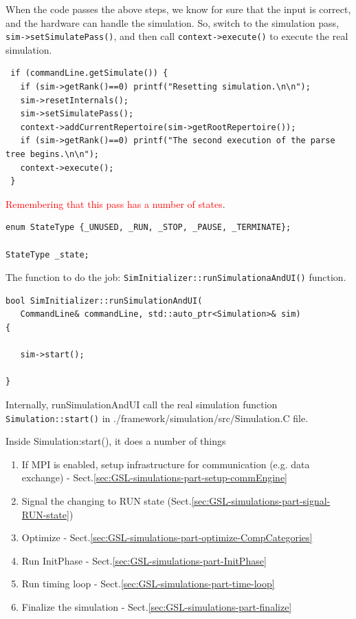 When the code passes the above steps, we know for sure that the
input is correct, and the hardware can handle the simulation. 
So, switch to the simulation pass, \verb!sim->setSimulatePass()!, and then
call \verb!context->execute()! to execute the real simulation.

\begin{lstlisting}
 if (commandLine.getSimulate()) {
   if (sim->getRank()==0) printf("Resetting simulation.\n\n");
   sim->resetInternals();  
   sim->setSimulatePass();
   context->addCurrentRepertoire(sim->getRootRepertoire());
   if (sim->getRank()==0) printf("The second execution of the parse tree begins.\n\n");
   context->execute();
 }
\end{lstlisting}

\textcolor{red}{Remembering that this pass has a number of states}.
\begin{verbatim}
enum StateType {_UNUSED, _RUN, _STOP, _PAUSE, _TERMINATE}; 

StateType _state;
\end{verbatim}

The function to do the job: \verb!SimInitializer::runSimulationaAndUI()!
function.
\begin{verbatim}
bool SimInitializer::runSimulationAndUI(                                                                      
   CommandLine& commandLine, std::auto_ptr<Simulation>& sim)                                                  
{         

   sim->start();

}
\end{verbatim}
Internally, runSimulationAndUI call the real simulation function
\verb!Simulation::start()! in ./framework/simulation/src/Simulation.C file.

Inside Simulation:start(), it does a number of things
\begin{enumerate}
  \item If MPI is enabled, setup infrastructure for communication (e.g. data
  exchange) - Sect.\ref{sec:GSL-simulations-part-setup-commEngine}
  
  \item Signal the changing to RUN state (Sect.\ref{sec:GSL-simulations-part-signal-RUN-state})
  
  \item Optimize - Sect.\ref{sec:GSL-simulations-part-optimize-CompCategories}
  
  \item Run InitPhase - Sect.\ref{sec:GSL-simulations-part-InitPhase}
  
  \item Run timing loop - Sect.\ref{sec:GSL-simulations-part-time-loop}
  
  \item Finalize the simulation - Sect.\ref{sec:GSL-simulations-part-finalize}
\end{enumerate}

